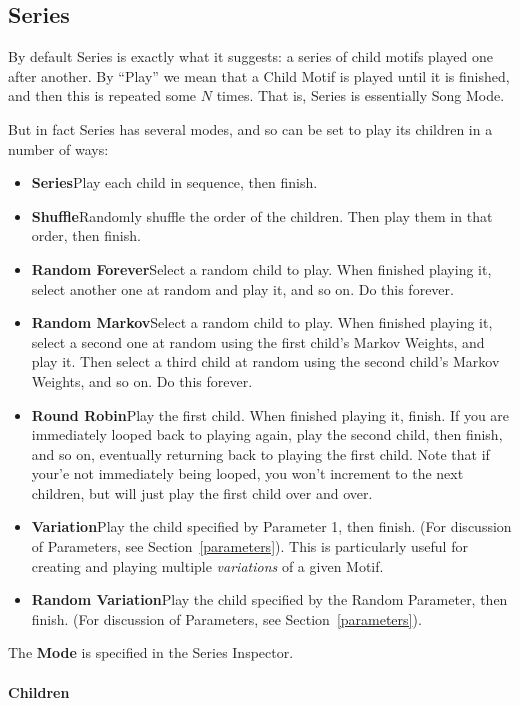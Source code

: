 \documentclass[twoside,10pt]{article}
\begin{document}
\subsection{Series}

By default Series is exactly what it suggests: a series of child motifs played one after another.   By ``Play'' we mean that a Child Motif is played until it is finished, and then this is repeated some \(N\) times.  That is, Series is essentially Song Mode.  

But in fact Series has several modes, and so can be set to play its children in a number of ways:

\begin{itemize}
\item{\bf Series}\quad Play each child in sequence, then finish.
\item{\bf Shuffle}\quad Randomly shuffle the order of the children.  Then play them in that order, then finish.
\item{\bf Random Forever}\quad Select a random child to play.  When finished playing it, select another one at random and play it, and so on.  Do this forever.  
\item{\bf Random Markov}\quad Select a random child to play.  When finished playing it, select a second one at random using the first child's Markov Weights, and play it.  Then select a third child at random using the second child's Markov Weights, and so on.  Do this forever.
\item{\bf Round Robin}\quad Play the first child.  When finished playing it, finish.  If you are immediately looped back to playing again, play the second child, then finish, and so on, eventually returning back to playing the first child.  Note that if your'e not immediately being looped, you won't increment to the next children, but will just play the first child over and over.
\item{\bf Variation}\quad Play the child specified by Parameter 1, then finish. (For discussion of Parameters, see Section~\ref{parameters}).  This is particularly useful for creating and playing multiple {\it variations} of a given Motif.
\item{\bf Random Variation}\quad Play the child specified by the Random Parameter, then finish. (For discussion of Parameters, see Section~\ref{parameters}).
\end{itemize}

The {\bf Mode} is specified in the Series Inspector.

\paragraph{Children}
\end{document}

